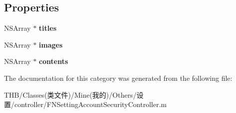 \subsection*{Properties}
\begin{DoxyCompactItemize}
\item 
\mbox{\label{category_f_n_setting_account_security_controller_07_08_a5c310177adb21d38eb7e902622c09279}} 
N\+S\+Array $\ast$ {\bfseries titles}
\item 
\mbox{\label{category_f_n_setting_account_security_controller_07_08_a9d043a1b6b3fad237fa56a4a9067bf1b}} 
N\+S\+Array $\ast$ {\bfseries images}
\item 
\mbox{\label{category_f_n_setting_account_security_controller_07_08_a98fb43bd1ef0ea336da2b22324e61b54}} 
N\+S\+Array $\ast$ {\bfseries contents}
\end{DoxyCompactItemize}


The documentation for this category was generated from the following file\+:\begin{DoxyCompactItemize}
\item 
T\+H\+B/\+Classes(类文件)/\+Mine(我的)/\+Others/设置/controller/F\+N\+Setting\+Account\+Security\+Controller.\+m\end{DoxyCompactItemize}
